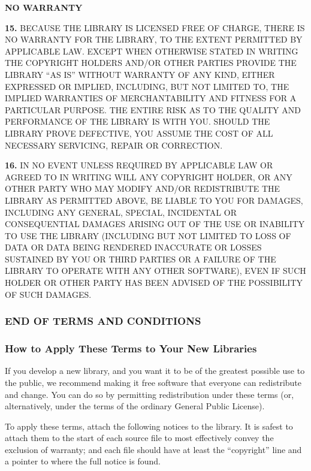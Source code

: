\documentclass[]{article}
\begin{document}
\textbf{NO WARRANTY}

\textbf{15.} BECAUSE THE LIBRARY IS LICENSED FREE OF CHARGE, THERE IS NO
WARRANTY FOR THE LIBRARY, TO THE EXTENT PERMITTED BY APPLICABLE LAW.
EXCEPT WHEN OTHERWISE STATED IN WRITING THE COPYRIGHT HOLDERS AND/OR
OTHER PARTIES PROVIDE THE LIBRARY ``AS IS'' WITHOUT WARRANTY OF ANY
KIND, EITHER EXPRESSED OR IMPLIED, INCLUDING, BUT NOT LIMITED TO, THE
IMPLIED WARRANTIES OF MERCHANTABILITY AND FITNESS FOR A PARTICULAR
PURPOSE. THE ENTIRE RISK AS TO THE QUALITY AND PERFORMANCE OF THE
LIBRARY IS WITH YOU. SHOULD THE LIBRARY PROVE DEFECTIVE, YOU ASSUME THE
COST OF ALL NECESSARY SERVICING, REPAIR OR CORRECTION.

\textbf{16.} IN NO EVENT UNLESS REQUIRED BY APPLICABLE LAW OR AGREED TO
IN WRITING WILL ANY COPYRIGHT HOLDER, OR ANY OTHER PARTY WHO MAY MODIFY
AND/OR REDISTRIBUTE THE LIBRARY AS PERMITTED ABOVE, BE LIABLE TO YOU FOR
DAMAGES, INCLUDING ANY GENERAL, SPECIAL, INCIDENTAL OR CONSEQUENTIAL
DAMAGES ARISING OUT OF THE USE OR INABILITY TO USE THE LIBRARY
(INCLUDING BUT NOT LIMITED TO LOSS OF DATA OR DATA BEING RENDERED
INACCURATE OR LOSSES SUSTAINED BY YOU OR THIRD PARTIES OR A FAILURE OF
THE LIBRARY TO OPERATE WITH ANY OTHER SOFTWARE), EVEN IF SUCH HOLDER OR
OTHER PARTY HAS BEEN ADVISED OF THE POSSIBILITY OF SUCH DAMAGES.

\subsubsection{END OF TERMS AND CONDITIONS}

\subsubsection{How to Apply These Terms to Your New Libraries}

If you develop a new library, and you want it to be of the greatest
possible use to the public, we recommend making it free software that
everyone can redistribute and change. You can do so by permitting
redistribution under these terms (or, alternatively, under the terms of
the ordinary General Public License).

To apply these terms, attach the following notices to the library. It is
safest to attach them to the start of each source file to most
effectively convey the exclusion of warranty; and each file should have
at least the ``copyright'' line and a pointer to where the full notice
is found.
\end{document}
